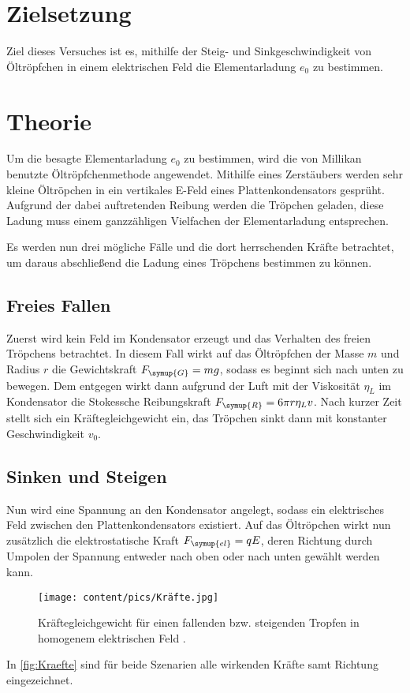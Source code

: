 \section{Zielsetzung}

Ziel dieses Versuches ist es, mithilfe der Steig- und Sinkgeschwindigkeit von Öltröpfchen in einem
elektrischen Feld die Elementarladung $e_0$ zu bestimmen.

\section{Theorie}
\label{sec:Theorie}
Um die besagte Elementarladung $e_0$ zu bestimmen, wird die von Millikan benutzte Öltröpfchenmethode angewendet.
Mithilfe eines Zerstäubers werden sehr kleine Öltröpchen in ein vertikales E-Feld eines Plattenkondensators gesprüht.
Aufgrund der dabei auftretenden Reibung werden die Tröpchen geladen, diese Ladung muss einem ganzzähligen
Vielfachen der Elementarladung entsprechen.

Es werden nun drei mögliche Fälle und die dort herrschenden Kräfte betrachtet, um daraus abschließend die
Ladung eines Tröpchens bestimmen zu können.

\subsection{Freies Fallen}
Zuerst wird kein Feld im Kondensator erzeugt und das Verhalten des freien Tröpchens betrachtet.
In diesem Fall wirkt auf das Öltröpfchen der Masse $m$ und Radius $r$ die Gewichtskraft $F_{\symup{G}}=mg$, sodass
es beginnt sich nach unten zu bewegen.
Dem entgegen wirkt dann aufgrund der Luft mit der Viskosität $\eta_{L}$ im Kondensator
die Stokessche Reibungskraft $F_{\symup{R}}=6\pi r\eta_{L}v$.
Nach kurzer Zeit stellt sich ein Kräftegleichgewicht ein, das Tröpchen sinkt dann mit konstanter
Geschwindigkeit $v_0$.

\subsection{Sinken und Steigen}
Nun wird eine Spannung an den Kondensator angelegt, sodass ein elektrisches Feld zwischen den Plattenkondensators
existiert. Auf das Öltröpchen wirkt nun zusätzlich die elektrostatische Kraft $F_{\symup{el}}=qE$, deren Richtung
durch Umpolen der Spannung entweder nach oben oder nach unten gewählt werden kann.
\begin{figure} [H]
    \centering
    \texttt{[image: content/pics/Kräfte.jpg]}
    \caption{Kräftegleichgewicht für einen fallenden bzw. steigenden Tropfen in homogenem elektrischen Feld \cite{v503}.}
    \label{fig:Kraefte}
\end{figure}
In \autoref{fig:Kraefte} sind für beide Szenarien alle wirkenden Kräfte samt Richtung eingezeichnet.

